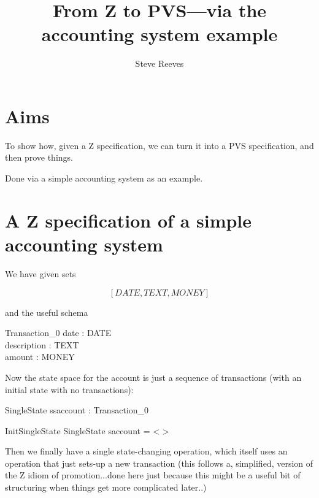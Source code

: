 \documentclass[11pt]{amsart}
\title{From Z to PVS---via the accounting system example}
\author{Steve Reeves}
\date{}                                           %
\begin{document}
\maketitle

\section{Aims}

To show how, given a Z specification, we can turn it into a PVS specification, and then prove things.

Done via a simple accounting system as an example.

\section{A Z specification of a simple accounting system}

We have given sets
 
\[
[DATE, TEXT, MONEY]
\]

and the useful schema

\begin{schema}{Transaction_0}
date : DATE\\
description : TEXT\\
amount : MONEY
\end{schema}

Now the state space for the account is just a sequence of transactions (with an initial state with no transactions):

\begin{schema}{SingleState}
ssaccount : \seq Transaction_0
\end{schema}

\begin{schema}{InitSingleState}
SingleState
\where
saccount = < >
\end{schema}

Then we finally have a single state-changing operation, which itself uses an operation that just sets-up a new transaction (this follows a, simplified, version of the Z idiom of promotion...done here just because this might be a useful bit of structuring when things get more complicated later..)
\end{document}
